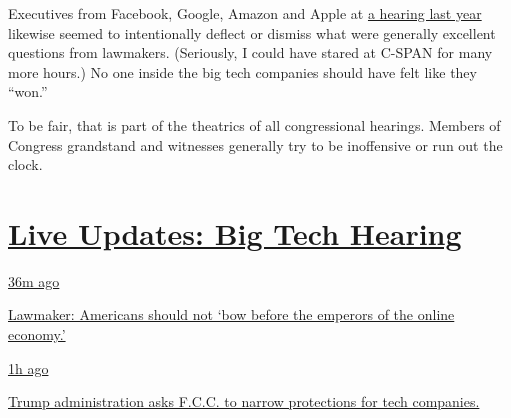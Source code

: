 Executives from Facebook, Google, Amazon and Apple at
\href{https://www.nytimes3xbfgragh.onion/2019/07/16/technology/big-tech-antitrust-hearing.html}{a
hearing last year} likewise seemed to intentionally deflect or dismiss
what were generally excellent questions from lawmakers. (Seriously, I
could have stared at C-SPAN for many more hours.) No one inside the big
tech companies should have felt like they ``won.''

To be fair, that is part of the theatrics of all congressional hearings.
Members of Congress grandstand and witnesses generally try to be
inoffensive or run out the clock.

\hypertarget{live-updates-big-tech-hearing}{%
\section{\texorpdfstring{\href{https://www.nytimes3xbfgragh.onion/live/2020/07/29/technology/tech-ceos-hearing-testimony?action=click\&pgtype=Article\&state=default\&region=MAIN_CONTENT_1\&context=storylines_live_updates}{Live
Updates: Big Tech
Hearing}}{Live Updates: Big Tech Hearing}}\label{live-updates-big-tech-hearing}}

\href{https://www.nytimes3xbfgragh.onion/live/2020/07/29/technology/tech-ceos-hearing-testimony?action=click\&pgtype=Article\&state=default\&region=MAIN_CONTENT_1\&context=storylines_live_updates\#lawmaker-americans-should-not-bow-before-the-emperors-of-the-online-economy}{36m
ago}

\href{https://www.nytimes3xbfgragh.onion/live/2020/07/29/technology/tech-ceos-hearing-testimony?action=click\&pgtype=Article\&state=default\&region=MAIN_CONTENT_1\&context=storylines_live_updates\#lawmaker-americans-should-not-bow-before-the-emperors-of-the-online-economy}{Lawmaker:
Americans should not `bow before the emperors of the online economy.'}

\href{https://www.nytimes3xbfgragh.onion/live/2020/07/29/technology/tech-ceos-hearing-testimony?action=click\&pgtype=Article\&state=default\&region=MAIN_CONTENT_1\&context=storylines_live_updates\#trump-administration-asks-fcc-to-narrow-protections-for-tech-companies}{1h
ago}

\href{https://www.nytimes3xbfgragh.onion/live/2020/07/29/technology/tech-ceos-hearing-testimony?action=click\&pgtype=Article\&state=default\&region=MAIN_CONTENT_1\&context=storylines_live_updates\#trump-administration-asks-fcc-to-narrow-protections-for-tech-companies}{Trump
administration asks F.C.C. to narrow protections for tech companies.}

